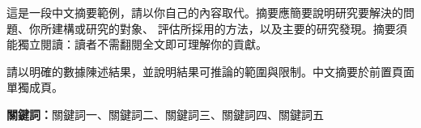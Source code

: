 

這是一段中文摘要範例，請以你自己的內容取代。摘要應簡要說明研究要解決的問題、你所建構或研究的對象、
評估所採用的方法，以及主要的研究發現。摘要須能獨立閱讀：讀者不需翻閱全文即可理解你的貢獻。

請以明確的數據陳述結果，並說明結果可推論的範圍與限制。中文摘要於前置頁面單獨成頁。

\bigskip
\noindent\textbf{關鍵詞：}關鍵詞一、關鍵詞二、關鍵詞三、關鍵詞四、關鍵詞五
